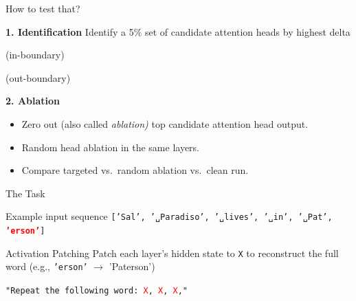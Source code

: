 \documentclass{beamer}
\begin{document}
\begin{frame}{How to test that?}

\begin{block}{\textbf{1. Identification}}
    Identify a 5\% set of candidate attention heads by highest delta
    \begin{center}

    (in-boundary)

    (out-boundary)

    \end{center}

\end{block}


\bigskip
\begin{block}{\textbf{2. Ablation}}
    \begin{itemize}
        \item Zero out (also called \textit{ablation)} top candidate attention head output.
        \item Random head ablation in the same layers.
        \item Compare targeted vs.\ random ablation vs.\ clean run.
    \end{itemize}
\end{block}

\end{frame}

\begin{frame}{The Task}
\begin{exampleblock}{Example input sequence}
\small{
\texttt{['Sal', '␣Paradiso', '␣lives', '␣in', '␣Pat', \textbf{\textcolor{red}{'erson'}}]}
}
\end{exampleblock}

\bigskip
\begin{block}{Activation Patching}
Patch each layer's hidden state to \texttt{X} to reconstruct the full word (e.g., \texttt{'erson'} $\rightarrow$ 'Paterson')
\end{block}

\medskip
\texttt{"Repeat the following word: \textcolor{red}{X}, \textcolor{red}{X}, \textcolor{red}{X},"} \\
\end{frame}
\end{document}
